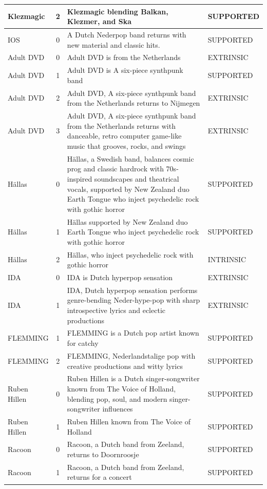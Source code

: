 \begin{center}
\begin{longtable}{p{3cm}cp{7cm}p{3cm}}
\midrule
Klezmagic & 2 & Klezmagic blending Balkan, Klezmer, and Ska & SUPPORTED \\
\midrule
IOS & 0 & A Dutch Nederpop band returns with new material and classic hits. & SUPPORTED \\
\midrule
Adult DVD & 0 & Adult DVD is from the Netherlands & EXTRINSIC \\
\midrule
Adult DVD & 1 & Adult DVD is A six-piece synthpunk band & SUPPORTED \\
\midrule
Adult DVD & 2 & Adult DVD, A six-piece synthpunk band from the Netherlands returns to Nijmegen & EXTRINSIC \\
\midrule
Adult DVD & 3 & Adult DVD, A six-piece synthpunk band from the Netherlands returns with danceable, retro computer game-like music that grooves, rocks, and swings & EXTRINSIC \\
\midrule
Hällas & 0 & Hällas, a Swedish band, balances cosmic prog and classic hardrock with 70s-inspired soundscapes and theatrical vocals, supported by New Zealand duo Earth Tongue who inject psychedelic rock with gothic horror & SUPPORTED \\
\midrule
Hällas & 1 & Hällas supported by New Zealand duo Earth Tongue who inject psychedelic rock with gothic horror & SUPPORTED \\
\midrule
Hällas & 2 & Hällas, who inject psychedelic rock with gothic horror & INTRINSIC \\
\midrule
IDA & 0 & IDA is Dutch hyperpop sensation & EXTRINSIC \\
\midrule
IDA & 1 & IDA, Dutch hyperpop sensation performs genre-bending Neder-hype-pop with sharp introspective lyrics and eclectic productions & EXTRINSIC \\
\midrule
FLEMMING & 1 & FLEMMING is a Dutch pop artist known for catchy & SUPPORTED \\
\midrule
FLEMMING & 2 & FLEMMING, Nederlandstalige pop with creative productions and witty lyrics & SUPPORTED \\
\midrule
Ruben Hillen & 0 & Ruben Hillen is a Dutch singer-songwriter known from The Voice of Holland, blending pop, soul, and modern singer-songwriter influences & SUPPORTED \\
\midrule
Ruben Hillen & 1 & Ruben Hillen known from The Voice of Holland & SUPPORTED \\
\midrule
Racoon & 0 & Racoon, a Dutch band from Zeeland, returns to Doornroosje & SUPPORTED \\
\midrule
Racoon & 1 & Racoon, a Dutch band from Zeeland, returns for a concert & SUPPORTED \\

\end{longtable}
\end{center}
